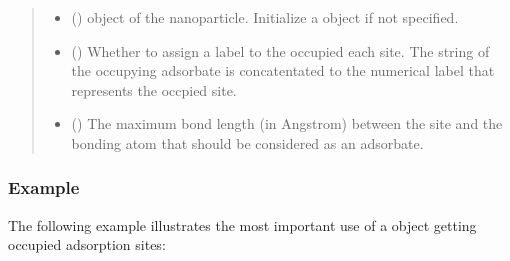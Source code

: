 \documentclass[letterpaper,10pt,english]{sphinxmanual}
\begin{document}
\begin{fulllineitems}
\begin{quote}
\begin{description}
\begin{itemize}
\item {} 
 (\sphinxstyleliteralemphasis{\sphinxupquote{,         }}) \textendash{}  object of the nanoparticle. Initialize a
 object if not specified.

\item {} 
 (\sphinxstyleliteralemphasis{\sphinxupquote{, }}) \textendash{} Whether to assign a label to the occupied each site. The string
of the occupying adsorbate is concatentated to the numerical
label that represents the occpied site.

\item {} 
 (\sphinxstyleliteralemphasis{\sphinxupquote{, }}) \textendash{} The maximum bond length (in Angstrom) between the site and the
bonding atom  that should be considered as an adsorbate.

\end{itemize}

\end{description}\end{quote}
\subsubsection*{Example}

The following example illustrates the most important use of a
 object \sphinxhyphen{} getting occupied adsorption sites:


\end{fulllineitems}
\end{document}
